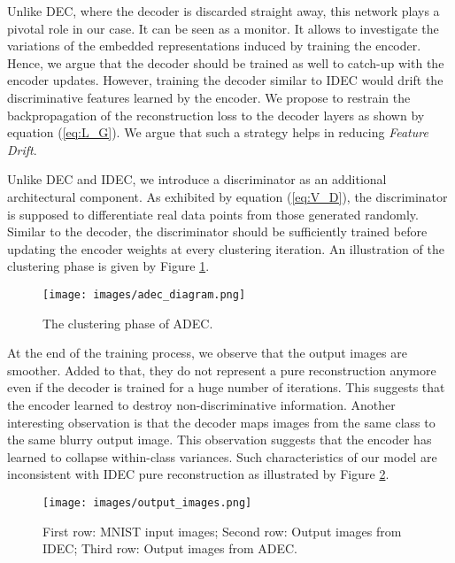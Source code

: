 \documentclass{article}
\begin{document}
Unlike DEC, where the decoder is discarded straight away, this network plays a pivotal role in our case. It can be seen as a monitor. It allows to investigate the variations of the embedded representations induced by training the encoder. Hence, we argue that the decoder should be trained as well to catch-up with the encoder updates. However, training the decoder similar to IDEC would drift the discriminative features learned by the encoder. We propose to restrain the backpropagation of the reconstruction loss to the decoder layers as shown by equation (\ref{eq:L_G}). We argue that such a strategy helps in reducing \textit{Feature Drift}.



Unlike DEC and IDEC, we introduce a discriminator as an additional architectural component. As exhibited by equation (\ref{eq:V_D}), the discriminator is supposed to differentiate real data points from those generated randomly. Similar to the decoder, the discriminator should be sufficiently trained before updating the encoder weights at every clustering iteration. An illustration of the clustering phase is given by Figure \ref{fig:clustering_arc}.




\begin{figure}[ht]
\vskip 0.2in
\begin{center}
\centerline{\texttt{[image: images/adec\_diagram.png]}}
\caption{The clustering phase of ADEC.}
\label{fig:clustering_arc}
\end{center}
\end{figure}

At the end of the training process, we observe that the output images are smoother. Added to that, they do not represent a pure reconstruction anymore even if the decoder is trained for a huge number of iterations. This suggests that the encoder learned to destroy non-discriminative information. Another interesting observation is that the decoder maps images from the same class to the same blurry output image. This observation suggests that the encoder has learned to collapse within-class variances. Such characteristics of our model are inconsistent with IDEC pure reconstruction as illustrated by Figure \ref{fig:recons_ADEC_IDEC}. 

\begin{figure}[ht]
\vskip 0.2in
\begin{center}
\centerline{\texttt{[image: images/output\_images.png]}}
\caption{First row: MNIST input images; Second row: Output images from IDEC; Third row: Output images from ADEC.}
\label{fig:recons_ADEC_IDEC}
\end{center}
\end{figure}
\end{document}
